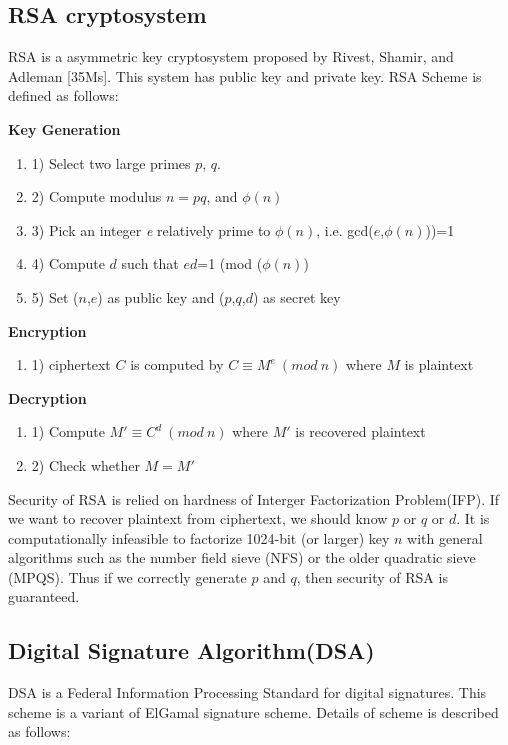 \documentclass[a4paper]{article}
\begin{document}
\subsection {RSA cryptosystem}
RSA is a asymmetric key cryptosystem proposed by Rivest, Shamir, and Adleman [35Ms]. This system has public key and private key. RSA Scheme is defined as follows:

\textbf{Key Generation}
\begin{enumerate}[label=]
      \item 1) Select two large primes $p$, $q$.
      
      \item 2) Compute modulus $n=pq$, and $\phi(n)$ 
      
      \item 3) Pick an integer \textit{e} relatively prime to $\phi(n)$, i.e. gcd($e$,$\phi(n)$))=1
      
      \item 4) Compute $d$ such that $ed$=1 (mod ($\phi(n)$)
      
      \item 5) Set ($n$,$e$) as public key  and ($p$,$q$,$d$) as secret key  
\end{enumerate}

\textbf{Encryption}
\begin{enumerate}[label=]
      \item 1) ciphertext $C$ is computed by  $C \equiv M^e \ (mod \ n)$ where $M$ is plaintext
\end{enumerate} 

\textbf{Decryption}
\begin{enumerate}[label=]
      \item 1) Compute $M' \equiv C^d \ (mod \ n)$ where $M'$ is recovered plaintext
      \item 2) Check whether $M=M'$
\end{enumerate} 

Security of RSA is relied on hardness of Interger Factorization Problem(IFP). If we want to recover plaintext from ciphertext, we should know $p$ or $q$ or $d$. It is computationally infeasible to factorize 1024-bit (or larger) key $n$ with general algorithms such as the number field sieve (NFS) or the older quadratic sieve (MPQS). Thus if we correctly generate $p$ and $q$, then security of RSA is guaranteed.

\subsection{Digital Signature Algorithm(DSA)}
DSA is a Federal Information Processing Standard for digital signatures. This scheme is a variant of ElGamal signature scheme. Details of scheme is described as follows:
\\
\end{document}
